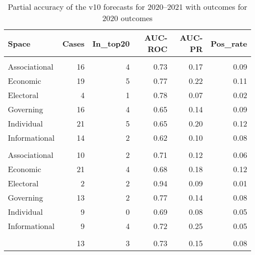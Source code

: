 \begin{table}

\caption{\label{tab:v10-acc}Partial accuracy of the v10 forecasts for 2020--2021 with outcomes for 2020 outcomes}
\centering
\begin{tabular}[t]{lrrrrr}
\toprule
Space & Cases & In\_top20 & AUC-ROC & AUC-PR & Pos\_rate\\
\midrule
\addlinespace[0.3em]
\multicolumn{6}{l}{\textbf{Closing movement}}\\
\hspace{1em}Associational & 16 & 4 & 0.73 & 0.17 & 0.09\\
\hspace{1em}Economic & 19 & 5 & 0.77 & 0.22 & 0.11\\
\hspace{1em}Electoral & 4 & 1 & 0.78 & 0.07 & 0.02\\
\hspace{1em}Governing & 16 & 4 & 0.65 & 0.14 & 0.09\\
\hspace{1em}Individual & 21 & 5 & 0.65 & 0.20 & 0.12\\
\hspace{1em}Informational & 14 & 2 & 0.62 & 0.10 & 0.08\\
\addlinespace[0.3em]
\multicolumn{6}{l}{\textbf{Opening movement}}\\
\hspace{1em}Associational & 10 & 2 & 0.71 & 0.12 & 0.06\\
\hspace{1em}Economic & 21 & 4 & 0.68 & 0.18 & 0.12\\
\hspace{1em}Electoral & 2 & 2 & 0.94 & 0.09 & 0.01\\
\hspace{1em}Governing & 13 & 2 & 0.77 & 0.14 & 0.08\\
\hspace{1em}Individual & 9 & 0 & 0.69 & 0.08 & 0.05\\
\hspace{1em}Informational & 9 & 4 & 0.72 & 0.25 & 0.05\\
\addlinespace[0.3em]
\multicolumn{6}{l}{\textbf{Average}}\\
\hspace{1em} & 13 & 3 & 0.73 & 0.15 & 0.08\\
\bottomrule
\end{tabular}
\end{table}

